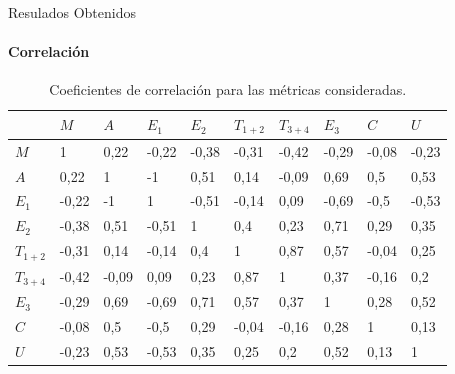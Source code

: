 \begin{frame}{Resulados Obtenidos}
\framesubtitle{Correlación}
\begin{table}[H] 
\centering
\footnotesize
\begin{tabular}{|p{0.7cm}|p{0.7cm}|p{0.7cm}|p{0.7cm}|p{0.7cm}|p{0.7cm}|p{0.7cm}|p{0.7cm}|p{0.7cm}|p{0.7cm}|}
\hline
& $M$ &  $A$  &   $E_1$ &  $E_2$  &  $T_{1+2}$  & $T_{3+4}$     & $E_3$ & $C$ & $U$ \\
\hline
$M$       &  1     &  0,22  & -0,22  & -0,38  &  -0,31  &  -0,42  &  -0,29 & -0,08    &  -0,23 \\
$A$       &  0,22  &  1  &  -1  &  0,51  &  0,14  &  -0,09  &  0,69  &  0,5           &  0,53 \\
$E_1$     &  -0,22 &  -1  &  1  &  -0,51  &  -0,14  &  0,09  &  -0,69  &  -0,5        &  -0,53 \\
$E_2$     &  -0,38 &  0,51  &  -0,51  &  1  &  0,4  &  0,23  &  0,71  &  0,29         &  0,35  \\
$T_{1+2}$ &  -0,31 &  0,14  &  -0,14  &  0,4  &  1  &  0,87  &  0,57  &  -0,04        &  0,25 \\
$T_{3+4}$ &  -0,42 &  -0,09  &  0,09  &  0,23  &  0,87  &  1  &  0,37  &  -0,16       &  0,2 \\
$E_3$     &  -0,29 &  0,69  &  -0,69  &  0,71  &  0,57  &  0,37  &  1  &  0,28        &  0,52 \\
$C$       &  -0,08 &  0,5  &  -0,5  &  0,29  &  -0,04  &  -0,16  &  0,28  &  1        &  0,13 \\
$U$       &  -0,23 &  0,53  &  -0,53  &  0,35  &  0,25  &  0,2  &  0,52  &  0,13      &  1 \\
\hline
\end{tabular}
\caption{Coeficientes de correlaci\'on para las m\'etricas consideradas.}
\label{sec:tabla-correlacion}
\end{table}

\end{frame}

